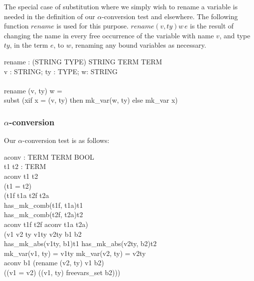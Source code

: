 \documentclass[a4paper,11pt,titlepage]{article}
\begin{document}
\begin{titlepage}
The special case of substitution
where we simply wish to rename a variable
is needed in the definition of our $\alpha$-conversion
test and elsewhere.
The following function $rename$ is used for this purpose.
$rename (v, ty) w\, e$ is the result of changing
the name in every free occurrence of the
variable with name $v$, and type $ty$, in the
term $e$, to $w$, renaming any bound variables
as necessary.

\begin{HOLConst}
\+	\PrNL{}rename\PrNN{} : (STRING \MMM{\times} TYPE) \MMM{\rightarrow} STRING \MMM{\rightarrow} TERM \MMM{\rightarrow} TERM\\
\PrPH{}
\+	\MMM{\forall} v : STRING; ty : TYPE; w: STRING\\
\+	\MMM{\bullet}\\
\+	rename (v, ty) w =\\
\+	subst (\MMM{\lambda}x\MMM{\bullet}if x = (v, ty) then mk\_var(w, ty) else mk\_var x)\\
\end{HOLConst}


\subsubsection{$\alpha$-conversion}
Our $\alpha$-conversion test is as follows:
\begin{HOLConst}
\+	\PrNL{}aconv\PrNN{} : TERM \MMM{\rightarrow} TERM \MMM{\rightarrow} BOOL\\
\PrPH{}
\+	\MMM{\forall}t1 t2 : TERM\MMM{\bullet}\\
\+	aconv t1 t2 \MMM{\Leftrightarrow}\\
\+		(t1 = t2)\\
\+	\MMM{\lor}	(\MMM{\exists}t1f t1a t2f t2a\MMM{\bullet}\\
\+			has\_mk\_comb(t1f, t1a)t1\\
\+		\MMM{\land}	has\_mk\_comb(t2f, t2a)t2\\
\+		\MMM{\land}	aconv t1f t2f \MMM{\land} aconv t1a t2a)\\
\+	\MMM{\lor}	(\MMM{\exists}v1 v2 ty v1ty v2ty b1 b2\MMM{\bullet}\\
\+			has\_mk\_abs(v1ty, b1)t1	\MMM{\land}	has\_mk\_abs(v2ty, b2)t2\\
\+		\MMM{\land}	mk\_var(v1, ty) = v1ty	\MMM{\land}	mk\_var(v2, ty) = v2ty\\
\+		\MMM{\land}	aconv b1 (rename (v2, ty) v1 b2)\\
\+		\MMM{\land}	((v1 = v2) \MMM{\lor} (\MMM{\lnot}(v1, ty) \MMM{\in} freevars\_set b2)))\\
\end{HOLConst}


\end{titlepage}
\end{document}
